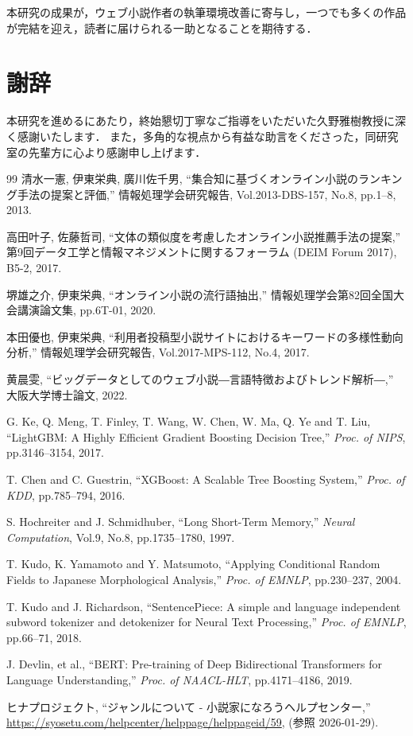 \documentclass[uplatex, dvipdfmx, 11pt, a4paper, report]{jsbook}
\begin{document}
本研究の成果が，ウェブ小説作者の執筆環境改善に寄与し，一つでも多くの作品が完結を迎え，読者に届けられる一助となることを期待する．





\chapter*{謝辞}
本研究を進めるにあたり，終始懇切丁寧なご指導をいただいた久野雅樹教授に深く感謝いたします．
また，多角的な視点から有益な助言をくださった，同研究室の先輩方に心より感謝申し上げます．

\begin{thebibliography}{99}
  清水一憲, 伊東栄典, 廣川佐千男, ``集合知に基づくオンライン小説のランキング手法の提案と評価,'' 情報処理学会研究報告, Vol.2013-DBS-157, No.8, pp.1--8, 2013.

  高田叶子, 佐藤哲司, ``文体の類似度を考慮したオンライン小説推薦手法の提案,'' 第9回データ工学と情報マネジメントに関するフォーラム (DEIM Forum 2017), B5-2, 2017.

  堺雄之介, 伊東栄典, ``オンライン小説の流行語抽出,'' 情報処理学会第82回全国大会講演論文集, pp.6T-01, 2020.

  本田優也, 伊東栄典, ``利用者投稿型小説サイトにおけるキーワードの多様性動向分析,'' 情報処理学会研究報告, Vol.2017-MPS-112, No.4, 2017.

  黄晨雯, ``ビッグデータとしてのウェブ小説―言語特徴およびトレンド解析―,'' 大阪大学博士論文, 2022.

  G. Ke, Q. Meng, T. Finley, T. Wang, W. Chen, W. Ma, Q. Ye and T. Liu, ``LightGBM: A Highly Efficient Gradient Boosting Decision Tree,'' \textit{Proc. of NIPS}, pp.3146--3154, 2017.

  T. Chen and C. Guestrin, ``XGBoost: A Scalable Tree Boosting System,'' \textit{Proc. of KDD}, pp.785--794, 2016.

  S. Hochreiter and J. Schmidhuber, ``Long Short-Term Memory,'' \textit{Neural Computation}, Vol.9, No.8, pp.1735--1780, 1997.

  T. Kudo, K. Yamamoto and Y. Matsumoto, ``Applying Conditional Random Fields to Japanese Morphological Analysis,'' \textit{Proc. of EMNLP}, pp.230--237, 2004.

  T. Kudo and J. Richardson, ``SentencePiece: A simple and language independent subword tokenizer and detokenizer for Neural Text Processing,'' \textit{Proc. of EMNLP}, pp.66--71, 2018.

  J. Devlin, et al., ``BERT: Pre-training of Deep Bidirectional Transformers for Language Understanding,'' \textit{Proc. of NAACL-HLT}, pp.4171--4186, 2019.

  ヒナプロジェクト, ``ジャンルについて - 小説家になろうヘルプセンター,'' \url{https://syosetu.com/helpcenter/helppage/helppageid/59}, (参照 2026-01-29).
\end{thebibliography}
\end{document}
